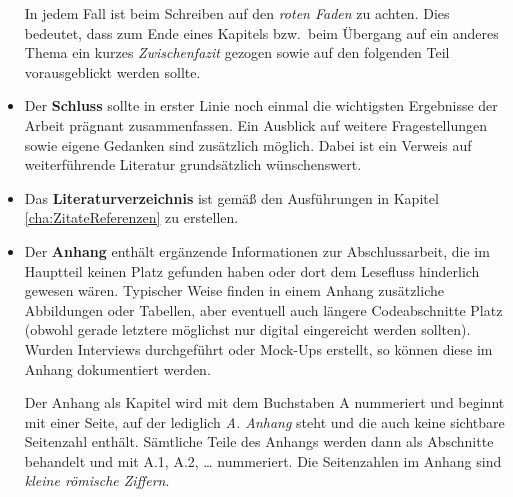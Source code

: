 \begin{itemize}[$\star$]
  In jedem Fall ist beim Schreiben auf den \emph{roten Faden} zu achten. Dies bedeutet, dass zum Ende eines Kapitels
  bzw.~beim Übergang auf ein anderes Thema ein kurzes \emph{Zwischenfazit} gezogen sowie auf den folgenden Teil
  vorausgeblickt werden sollte.
\item Der \textbf{Schluss} sollte in erster Linie noch einmal die wichtigsten Ergebnisse der Arbeit prägnant
  zusammenfassen. Ein Ausblick auf weitere Fragestellungen sowie eigene Gedanken sind zusätzlich möglich. Dabei
  ist ein Verweis auf weiterführende Literatur grundsätzlich wünschenswert.
\item Das \textbf{Literaturverzeichnis} ist gemäß den Ausführungen in Kapitel \ref{cha:ZitateReferenzen} zu
  erstellen.
\item Der \textbf{Anhang} enthält ergänzende Informationen zur Abschlussarbeit, die im Hauptteil keinen Platz
  gefunden haben oder dort dem Lesefluss hinderlich gewesen wären. Typischer Weise finden in einem Anhang zusätzliche
  Abbildungen oder Tabellen, aber eventuell auch längere Codeabschnitte Platz (obwohl gerade letztere möglichst
  nur digital eingereicht werden sollten). Wurden Interviews durchgeführt oder Mock-Ups erstellt, so können diese
  im Anhang dokumentiert werden.
  
  Der Anhang als Kapitel wird mit dem Buchstaben A nummeriert und beginnt mit einer Seite, auf der lediglich
  \emph{A. Anhang} steht und die auch keine sichtbare Seitenzahl enthält.
  Sämtliche Teile des Anhangs werden dann als Abschnitte behandelt und mit A.1, A.2, 
  \ldots{} nummeriert. Die Seitenzahlen im Anhang sind \emph{kleine römische Ziffern}.
\end{itemize}
%
